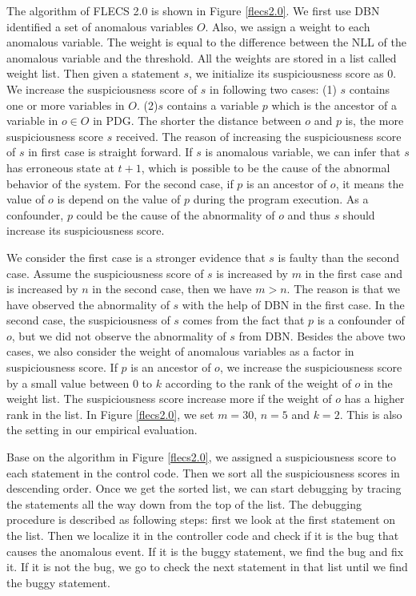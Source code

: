 The algorithm of FLECS 2.0 is shown in Figure \ref{flecs2.0}. We first use DBN identified a set of anomalous variables $O$. Also, we assign a weight to each anomalous variable. The weight is equal to the difference between the NLL of the anomalous variable and the threshold. All the weights are stored in a list called weight list. Then given a statement $s$, we initialize its suspiciousness score as 0. We increase the suspiciousness score of $s$ in following two cases: (1) $s$ contains one or more variables in $O$. (2)$s$ contains a variable $p$ which is  the ancestor of a variable in $o \in O$ in PDG. The shorter the distance between $o$ and $p$ is, the more suspiciousness score $s$ received. The reason of increasing the suspiciousness score of $s$ in first case is straight forward. If $s$ is anomalous variable, we can infer that $s$ has erroneous state at $t+1$, which is possible to be the cause of the abnormal behavior of the system. For the second case, if $p$ is an ancestor of $o$, it means the value of $o$ is depend on the value of $p$ during the program execution. As a confounder, $p$ could be the cause of the abnormality of $o$ and thus $s$ should increase its suspiciousness score. 

We consider the first case is a stronger evidence that $s$ is faulty than the second case.  Assume the suspiciousness score of $s$ is increased by $m$ in the first case and is increased by $n$ in the second case, then we have $m>n$. The reason is that we have observed the abnormality of $s$ with the help of DBN in the first case. In the second case, the suspiciousness of $s$ comes from the fact that $p$ is a confounder of $o$,  but we did not observe the abnormality of $s$ from DBN.  Besides the above two cases, we also consider the weight of anomalous variables as a factor in suspiciousness score. If $p$ is an ancestor of $o$, we increase the suspiciousness score by a small value between 0 to $k$ according to the rank of the weight of $o$ in the weight list. The suspiciousness score increase more if the weight of $o$ has a higher rank in the list. In Figure \ref{flecs2.0}, we set $m=30$, $n=5$ and $k=2$. This is also the setting in our empirical evaluation.

Base on the algorithm in Figure \ref{flecs2.0}, we assigned a suspiciousness score to each statement in the control code. Then we sort all the suspiciousness scores in descending order. Once we get the sorted list, we can start debugging by tracing the statements all the way down from the top of the list. The debugging procedure is described as following steps: first we look at the first statement on the list. Then we localize it in the controller code and check if it is the bug that causes the anomalous event. If it is the buggy statement, we find the bug and fix it. If it is not the bug, we go to check the next statement in that list until we find the buggy statement.

